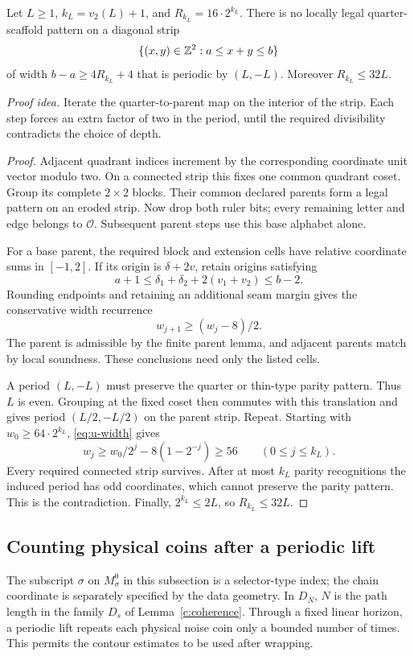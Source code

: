 \begin{lemma}\label{u:strip}
Let \(L\ge1\), \(k_L=v_2(L)+1\), and \(R_{k_L}=16\cdot2^{k_L}\).
There is no locally legal quarter-scaffold pattern on a diagonal strip
\[
 \{(x,y)\in\mathbb Z^2:a\le x+y\le b\}
\]
of width \(b-a\ge4R_{k_L}+4\) that is periodic by \((L,-L)\).
Moreover \(R_{k_L}\le32L\).
\end{lemma}
\par\noindent\emph{Proof idea.} Iterate the quarter-to-parent map on the interior of the strip. Each step forces an extra factor of two in the period, until the required divisibility contradicts the choice of depth.

\begin{proof}
Adjacent quadrant indices increment by the corresponding
coordinate unit vector modulo two. On a connected strip this fixes one
common quadrant coset. Group its complete \(2\times2\) blocks. Their
common declared parents form a legal pattern on an eroded strip. Now
drop both ruler bits; every remaining letter and edge belongs to
\(\mathcal O\). Subsequent parent steps use this base alphabet alone.

For a base parent, the required block and extension cells have relative
coordinate sums in \([-1,2]\). If its origin is \(\delta+2v\), retain
origins satisfying
\[
 a+1\le\delta_1+\delta_2+2(v_1+v_2)\le b-2.
\]
Rounding endpoints and retaining an additional seam margin gives the
conservative width recurrence
\begin{equation}\label{eq:u-width}
 w_{j+1}\ge(w_j-8)/2.
\end{equation}
The parent is admissible by the finite parent lemma, and adjacent
parents match by local soundness. These conclusions need only the
listed cells.

A period \((L,-L)\) must preserve the quarter or thin-type parity
pattern. Thus \(L\) is even. Grouping at the fixed coset then commutes
with this translation and gives period \((L/2,-L/2)\) on the parent
strip. Repeat. Starting with \(w_0\ge64\cdot2^{k_L}\),
\eqref{eq:u-width} gives
\[
 w_j\ge w_0/2^j-8(1-2^{-j})\ge56\qquad(0\le j\le k_L).
\]
Every required connected strip survives. After at most \(k_L\) parity
recognitions the induced period has odd coordinates, which cannot
preserve the parity pattern. This is the contradiction. Finally,
\(2^{k_L}\le2L\), so \(R_{k_L}\le32L\).
\end{proof}

\subsection{Counting physical coins after a periodic lift}
The subscript \(\sigma\) on \(M^0_\sigma\) in this subsection is
a selector-type index; the chain coordinate is separately specified by
the data geometry. In \(D_N\), \(N\) is the path length in the
family \(D_s\) of Lemma~\ref{c:coherence}.
Through a fixed linear horizon, a periodic lift repeats each physical
noise coin only a bounded number of times. This permits the contour
estimates to be used after wrapping.

